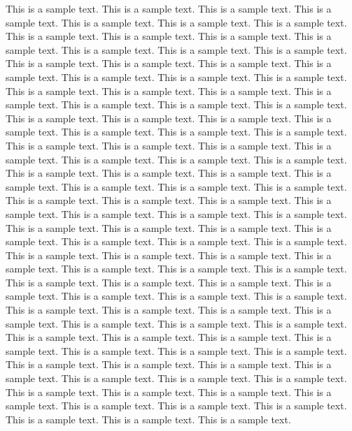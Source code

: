 This is a sample text.
This is a sample text.
This is a sample text.
This is a sample text.
This is a sample text.
This is a sample text.
This is a sample text.
This is a sample text.
This is a sample text.
This is a sample text.
This is a sample text.
This is a sample text.
This is a sample text.
This is a sample text.
This is a sample text.
This is a sample text.
This is a sample text.
This is a sample text.
This is a sample text.
This is a sample text.
This is a sample text.
This is a sample text.
This is a sample text.
This is a sample text.
This is a sample text.
This is a sample text.
This is a sample text.
This is a sample text.
This is a sample text.
This is a sample text.
This is a sample text.
This is a sample text.
This is a sample text.
This is a sample text.
This is a sample text.
This is a sample text.
This is a sample text.
This is a sample text.
This is a sample text.
This is a sample text.
This is a sample text.
This is a sample text.
This is a sample text.
This is a sample text.
This is a sample text.
This is a sample text.
This is a sample text.
This is a sample text.
This is a sample text.
This is a sample text.
This is a sample text.
This is a sample text.
This is a sample text.
This is a sample text.
This is a sample text.
This is a sample text.
This is a sample text.
This is a sample text.
This is a sample text.
This is a sample text.
This is a sample text.
This is a sample text.
This is a sample text.
This is a sample text.
This is a sample text.
This is a sample text.
This is a sample text.
This is a sample text.
This is a sample text.
This is a sample text.
This is a sample text.
This is a sample text.
This is a sample text.
This is a sample text.
This is a sample text.
This is a sample text.
This is a sample text.
This is a sample text.
This is a sample text.
This is a sample text.
This is a sample text.
This is a sample text.
This is a sample text.
This is a sample text.
This is a sample text.
This is a sample text.
This is a sample text.
This is a sample text.
This is a sample text.
This is a sample text.
This is a sample text.
This is a sample text.
This is a sample text.
This is a sample text.
This is a sample text.
This is a sample text.
This is a sample text.
This is a sample text.
This is a sample text.
This is a sample text.
This is a sample text.
This is a sample text.
This is a sample text.
This is a sample text.
This is a sample text.
This is a sample text.
This is a sample text.
This is a sample text.
